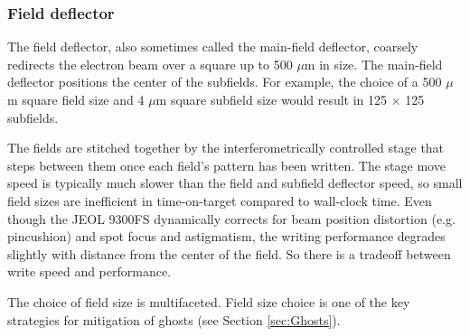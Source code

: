 \subsubsection{Field deflector}
\label{sec:Field}
The field deflector, also sometimes called the main-field deflector, coarsely redirects the electron beam over a square up to 500 $\mu$m in size.  The main-field deflector positions the center of the subfields.  For example, the choice of a 500 $\mu$m square field size and 4 $\mu$m square subfield size would result in 125 $\times$ 125 subfields.

The fields are stitched together by the interferometrically controlled stage that steps between them once each field's pattern has been written.  The stage move speed is typically much slower than the field and subfield deflector speed, so small field sizes are inefficient in time-on-target compared to wall-clock time.  Even though the JEOL 9300FS dynamically corrects for beam position distortion (e.g. pincushion) and spot focus and astigmatism, the writing performance degrades slightly with distance from the center of the field.  So there is a tradeoff between write speed and performance.  

The choice of field size is multifaceted.  Field size choice is one of the key strategies for mitigation of ghosts (see Section \ref{sec:Ghosts}).

